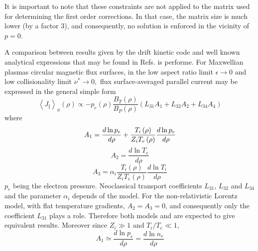 It is important to note that these constraints are not applied to the matrix
used for determining the first order corrections. In that case, the matrix
size is much lower (by a factor $3$), and consequently, no solution is
enforced in the vicinity of $p=0$.

A comparison between results given by the drift kinetic code and well known
analytical expressions that may be found in Refs. \cite{hin76}\cite{hir81}%
\cite{hir88}\cite{kes94}\cite{sau99}\cite{sau02} is performe. For Maxwellian
plasmas circular magnetic flux surfaces, in the low aspect ratio limit $%
\epsilon \rightarrow 0$ and low collisionality limit $\nu ^{*}\rightarrow 0,$
flux surface-averaged parallel current may be expressed in the general
simple form
\begin{equation}
\left\langle J_{\Vert }\right\rangle _{\phi }\left( \rho \right) \propto
-p_{e}\left( \rho \right) \frac{B_{T}\left( \rho \right) }{B_{P}\left( \rho
\right) }\left( L_{31}A_{1}+L_{32}A_{2}+L_{34}A_{4}\right)
\label{bootstrapthermalanalytic}
\end{equation}
where
\begin{equation}
A_{1}=\frac{d\ln p_{e}}{d\rho }+\frac{T_{i}\left( \rho \right) }{%
Z_{i}T_{e}\left( \rho \right) }\frac{d\ln p_{e}}{d\rho }  \label{A1coeff}
\end{equation}
\begin{equation}
A_{2}=\frac{d\ln T_{e}}{d\rho }  \label{A2coef}
\end{equation}
\begin{equation}
A_{3}=\alpha _{i}\frac{T_{i}\left( \rho \right) }{Z_{i}T_{e}\left( \rho
\right) }\frac{d\ln T_{i}}{d\rho }  \label{A3coef}
\end{equation}
$p_{e}$ being the electron pressure. Neoclassical transport coefficients $%
L_{31}$, $L_{32}$ and $L_{34}$ and the parameter $\alpha _{i}$ depends of
the model. For the non-relativistic Lorentz model, with flat temperature
gradients, $A_{2}=A_{3}=0$, and consequently only the coefficient $L_{31}$
plays a role. Therefore both models \cite{hir88} and \cite{sau99} are
expected to give equivalent results. Moreover since $Z_{i}\gg 1$ and $%
T_{i}/T_{e}\ll 1,$
\begin{equation}
A_{1}\simeq \frac{d\ln p_{e}}{d\rho }=\frac{d\ln n_{e}}{d\rho }
\end{equation}

